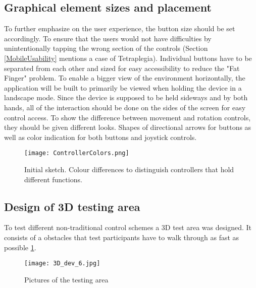 \subsection{Graphical element sizes and placement}
To further emphasize on the user experience, the button size should be set accordingly. To ensure that the users would not have difficulties by unintentionally tapping the wrong section of the controls (Section \ref{MobileUsability} mentions a case of Tetraplegia). Individual buttons have to be separated from each other and sized for easy accessibility to reduce the "Fat Finger" problem. To enable a bigger view of the environment horizontally, the application will be built to primarily be viewed when holding the device in a landscape mode. Since the device is supposed to be held sideways and by both hands, all of the interaction should be done on the sides of the screen for easy control access.
To show the difference between movement and rotation controls, they should be given different looks. Shapes of directional arrows for buttons as well as color indication for both buttons and joystick controls.

\begin{figure}[H]
\centering
\texttt{[image: ControllerColors.png]}
\caption{Initial sketch. Colour differences to distinguish controllers that hold different functions.}
\end{figure}

\subsection{Design of 3D testing area}
To test different non-traditional control schemes a 3D test area was designed. It consists of a obstacles that test participants have to walk through as fast as possible \ref{TestLevels}.

\begin{figure}[H]
\centering
\texttt{[image: 3D\_dev\_6.jpg]}
\caption{Pictures of the testing area}
\label{TestLevels}
\end{figure}

